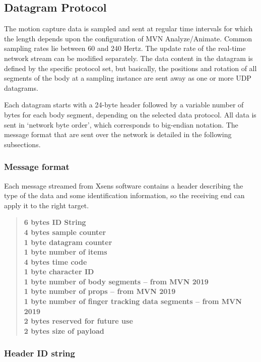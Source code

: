 \subsection{Datagram Protocol}

The motion capture data is sampled and sent at regular time intervals for which the length depends upon the configuration of MVN Analyze/Animate. Common sampling rates lie between 
60 and 240 Hertz. The update rate of the real-time network stream can be modified separately. The data content in the datagram is defined by the specific protocol set, but basically, 
the positions and rotation of all segments of the body at a sampling instance are sent away as one or more UDP datagrams.

Each datagram starts with a 24-byte header followed by a variable number of bytes for each body segment, depending on the selected data protocol. All data is sent in ‘network byte order’,
 which corresponds to big-endian notation. The message format that are sent over the network is detailed in the following subsections.

\subsubsection{Message format}

Each message streamed from Xsens software contains a header describing the type of the data and some identification information, so the receiving end can apply it to the right target.

\begin{quote}
    \textbf{
    6 bytes ID String \\
    4 bytes sample counter \\
    1 byte datagram counter \\
    1 byte number of items \\
    4 bytes time code \\
    1 byte character ID \\
    1 byte number of body segments – from MVN 2019 \\
    1 byte number of props – from MVN 2019 \\
    1 byte number of finger tracking data segments – from MVN 2019 \\
    2 bytes reserved for future use \\
    2 bytes size of payload}
\end{quote}

\subsubsection{Header ID string}

